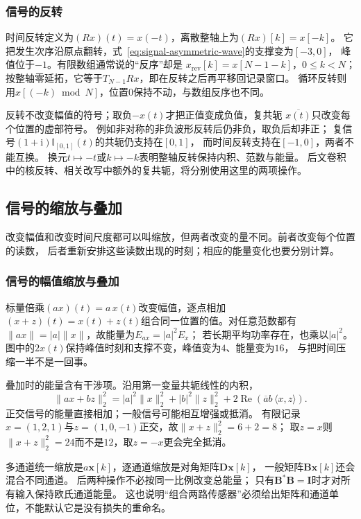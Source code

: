 \subsubsection{信号的反转}

时间反转定义为$(Rx)(t)=x(-t)$，离散整轴上为$(Rx)[k]=x[-k]$。
它把发生次序沿原点翻转，式~\eqref{eq:signal-asymmetric-wave}的支撑变为$[-3,0]$，
峰值位于$-1$。有限数组通常说的“反序”却是
$x_{\mathrm{rev}}[k]=x[N-1-k]$，$0\leq k<N$；
按整轴零延拓，它等于$T_{N-1}Rx$，即在反转之后再平移回记录窗口。
循环反转则用$x[(-k)\bmod N]$，位置$0$保持不动，与数组反序也不同。

反转不改变幅值的符号；取负$-x(t)$才把正值变成负值，复共轭
$\overline{x(t)}$只改变每个位置的虚部符号。
例如非对称的非负波形反转后仍非负，取负后却非正；
复信号$(1+\mathrm i)\mathbb I_{[0,1]}(t)$的共轭仍支持在$[0,1]$，
而时间反转支持在$[-1,0]$，两者不能互换。
换元$t\mapsto-t$或$k\mapsto-k$表明整轴反转保持内积、范数与能量。
后文卷积中的核反转、相关改写中额外的复共轭，将分别使用这里的两项操作。

\subsection{信号的缩放与叠加}

改变幅值和改变时间尺度都可以叫缩放，但两者改变的量不同。前者改变每个位置的读数，
后者重新安排这些读数出现的时刻；相应的能量变化也要分别计算。

\subsubsection{信号的幅值缩放与叠加}

标量倍乘$(ax)(t)=a\,x(t)$改变幅值，逐点相加
$(x+z)(t)=x(t)+z(t)$组合同一位置的值。对任意范数都有
$\|ax\|=|a|\|x\|$，故能量为$E_{ax}=|a|^2E_x$；
若长期平均功率存在，也乘以$|a|^2$。
图中的$2x(t)$保持峰值时刻和支撑不变，峰值变为$4$、能量变为$16$，
与把时间压缩一半不是一回事。

叠加时的能量含有干涉项。沿用第一变量共轭线性的内积，
\[
  \|ax+bz\|_2^2
  =|a|^2\|x\|_2^2+|b|^2\|z\|_2^2
   +2\operatorname{Re}\!\left(\overline a b\,\langle x,z\rangle\right).
\]
正交信号的能量直接相加；一般信号可能相互增强或抵消。
有限记录$x=(1,2,1)$与$z=(1,0,-1)$正交，故$\|x+z\|_2^2=6+2=8$；
取$z=x$则$\|x+z\|_2^2=24$而不是$12$，取$z=-x$更会完全抵消。

多通道统一缩放是$a\bm x[k]$，逐通道缩放是对角矩阵$\bm D\bm x[k]$，
一般矩阵$\bm B\bm x[k]$还会混合不同通道。
后两种操作不必按同一比例改变总能量；
只有$\bm B^*\bm B=\bm I$时才对所有输入保持欧氏通道能量。
这也说明“组合两路传感器”必须给出矩阵和通道单位，不能默认它是没有损失的重命名。

